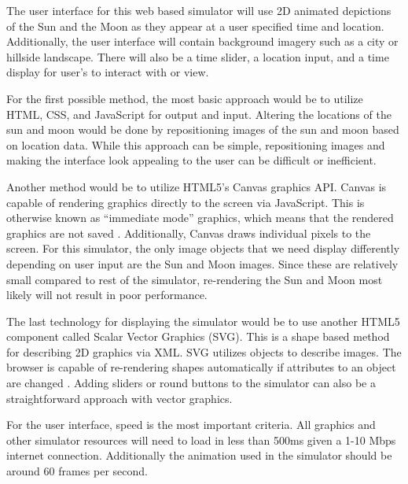\documentclass[10pt, onecolumn, draftclsnofoot, letterpaper, compsoc]{IEEEtran}
\begin{document}
The user interface for this web based simulator will use 2D animated depictions
of the Sun and the Moon as they appear at a user specified time and location.
Additionally, the user interface will contain background imagery such as a
city or hillside landscape. There will also be a time slider, a location
input, and a time display for user’s to interact with or view.

For the first possible method, the most basic approach would be to utilize
HTML, CSS, and JavaScript for output and input. Altering the locations of the
sun and moon would be done by repositioning images of the sun and moon based on
location data. While this approach can be simple, repositioning images and
making the interface look appealing to the user can be difficult or
inefficient.

Another method would be to utilize HTML5’s Canvas graphics API. Canvas is
capable of rendering graphics directly to the screen via JavaScript. This is
otherwise known as “immediate mode” graphics, which means that the rendered
graphics are not saved \cite{SVGvsC}. Additionally, Canvas draws individual
pixels to the screen. For this simulator, the only image objects that we need
display differently depending on user input are the Sun and Moon images.
Since these are relatively small compared to rest of the simulator,
re-rendering the Sun and Moon most likely will not result in poor performance.

The last technology for displaying the simulator would be to use another HTML5
component called Scalar Vector Graphics (SVG). This is a shape based method
for describing 2D graphics via XML.  SVG utilizes objects to describe images.
The browser is capable of re-rendering shapes automatically if attributes to
an object are changed \cite{SVG}. Adding sliders or round buttons to the
simulator can also be a straightforward approach with vector graphics.

For the user interface, speed is the most important criteria. All graphics and
other simulator resources will need to load in less than 500ms given a 1-10
Mbps internet connection. Additionally the animation used in the simulator
should be around 60 frames per second.
\end{document}
